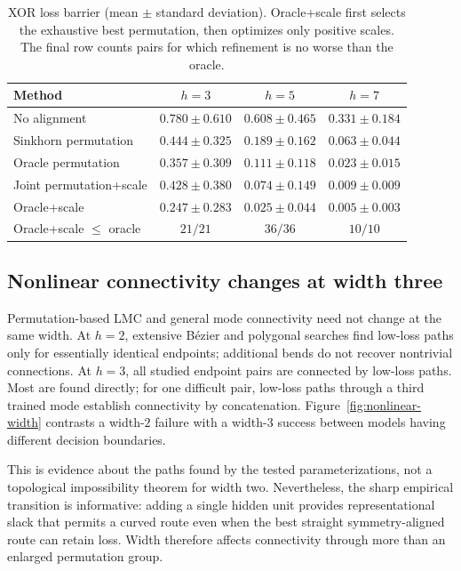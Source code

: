 \documentclass{article}
\begin{document}
\begin{table}[t]
\caption{XOR loss barrier (mean $\pm$ standard deviation).  Oracle+scale first
selects the exhaustive best permutation, then optimizes only positive scales.
The final row counts pairs for which refinement is no worse than the oracle.}
\label{tab:xor-scale}
\centering
\small
\begin{tabular}{lccc}
\toprule
Method & $h=3$ & $h=5$ & $h=7$ \\
\midrule
No alignment & $0.780\pm0.610$ & $0.608\pm0.465$ & $0.331\pm0.184$ \\
Sinkhorn permutation & $0.444\pm0.325$ & $0.189\pm0.162$ & $0.063\pm0.044$ \\
Oracle permutation & $0.357\pm0.309$ & $0.111\pm0.118$ & $0.023\pm0.015$ \\
Joint permutation+scale & $0.428\pm0.380$ & $0.074\pm0.149$ & $0.009\pm0.009$ \\
Oracle+scale & $\mathbf{0.247\pm0.283}$ & $\mathbf{0.025\pm0.044}$ & $\mathbf{0.005\pm0.003}$ \\
\midrule
Oracle+scale $\leq$ oracle & $21/21$ & $36/36$ & $10/10$ \\
\bottomrule
\end{tabular}
\end{table}

\subsection{Nonlinear connectivity changes at width three}

Permutation-based LMC and general mode connectivity need not change at the same
width.  At $h=2$, extensive B\'ezier and polygonal searches find low-loss paths
only for essentially identical endpoints; additional bends do not recover
nontrivial connections.  At $h=3$, all studied endpoint pairs are connected by
low-loss paths.  Most are found directly; for one difficult pair, low-loss
paths through a third trained mode establish connectivity by concatenation.
Figure~\ref{fig:nonlinear-width} contrasts a width-$2$ failure with a width-$3$
success between models having different decision boundaries.

This is evidence about the paths found by the tested parameterizations, not a
topological impossibility theorem for width two.  Nevertheless, the sharp
empirical transition is informative: adding a single hidden unit provides
representational slack that permits a curved route even when the best straight
symmetry-aligned route can retain loss.  Width therefore affects connectivity
through more than an enlarged permutation group.
\end{document}
